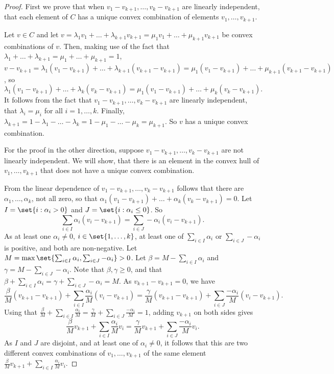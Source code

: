 \documentclass[12pt,a4paper]{article}
\begin{document}
\begin{proof}
First we prove that when $v_1-v_{k+1},\ldots,v_k-v_{k+1}$ are linearly independent, that each element of $C$ has a unique convex combination of elements $v_1,\ldots,v_{k+1}$.

Let $v\in C $ and let $v=\lambda_1v_1+\ldots+\lambda_{k+1}v_{k+1}=\mu_1v_1+\ldots+\mu_{k+1}v_{k+1}$ be convex combinations of $v$. Then, making use of the fact that $\lambda_1+\ldots+\lambda_{k+1}=\mu_1+\ldots+\mu_{k+1}=1$, $
v-v_{k+1}=\lambda_1(v_1-v_{k+1})+\ldots+\lambda_{k+1}(v_{k+1}-v_{k+1})=\mu_1(v_1-v_{k+1})+\ldots+\mu_{k+1}(v_{k+1}-v_{k+1})$,
so 
\[\lambda_1(v_1-v_{k+1})+\ldots+\lambda_{k}(v_{k}-v_{k+1})=\mu_1(v_1-v_{k+1})+\ldots+\mu_{k}(v_{k}-v_{k+1}).\]
It follows from the fact that $v_1-v_{k+1},\ldots,v_k-v_{k+1}$ are linearly independent, that $\lambda_i=\mu_i$ for all $i=1,\ldots,k$. Finally, $\lambda_{k+1}=1-\lambda_1-\ldots-\lambda_k=1-\mu_1-\ldots-\mu_k=\mu_{k+1}$. So  $v$ has a unique convex combination.

For the proof in the other direction, suppose $v_1-v_{k+1},\ldots,v_k-v_{k+1}$ are not linearly independent. We will show, that there is an element in the convex hull of $v_1,\ldots,v_{k+1}$ that does not have a unique convex combination. 



From the linear dependence of  $v_1-v_{k+1},\ldots,v_k-v_{k+1}$ follows that there are $\alpha_1,\ldots,\alpha_k$, not all zero, so that $
\alpha_1(v_1-v_{k+1})+\ldots+\alpha_k(v_k-v_{k+1})=0$. 
Let $I=\set{i:\alpha_i>0}$ and $J=\set{i:\alpha_i\le 0}$.  So 
\[
\sum_{i\in I}\alpha_i(v_i-v_{k+1})=\sum_{i\in J}-\alpha_i(v_i-v_{k+1}).
\]
As at least one $\alpha_i\neq 0$, $i\in\set{1,\ldots,k}$, at least one of $\sum_{i\in I}\alpha_i$ or $\sum_{i\in J}-\alpha_i$ is positive, and both are non-negative. Let $M=\max\set{\sum_{i\in I}\alpha_i, \sum_{i\in J}-\alpha_i}>0$. Let $\beta=M-\sum_{i\in I}\alpha_i$ and $\gamma=M-\sum_{i\in J}-\alpha_i$. Note that $\beta,\gamma\ge 0$, and that 
$\beta+\sum_{i\in I}\alpha_i=\gamma+\sum_{i\in J}-\alpha_i=M$. As $v_{k+1}-v_{k+1}=0$, we have 
\[
\frac\beta M(v_{k+1}-v_{k+1})+\sum_{i\in I}\frac{\alpha_i}M(v_i-v_{k+1})=\frac\gamma M(v_{k+1}-v_{k+1})+\sum_{i\in J}\frac{-\alpha_i}M(v_i-v_{k+1}).
\]
Using that 
$\frac\beta M+\sum_{i\in I}\frac{\alpha_i}M=\frac\gamma M+\sum_{i\in J}\frac{-\alpha_i}M=1$, adding $v_{k+1}$ on both sides gives
\[
\frac\beta Mv_{k+1}+\sum_{i\in I}\frac{\alpha_i}Mv_i=\frac\gamma Mv_{k+1}+\sum_{i\in J}\frac{-\alpha_i}Mv_i.
\]
As $I$ and $J$ are disjoint, and at least one of $\alpha_i\neq 0$, it follows that this are two different convex combinations of $v_1,\ldots,v_{k+1}$ of the same element $\frac\beta Mv_{k+1}+\sum_{i\in I}\frac{\alpha_i}Mv_i$. 
\end{proof}
\end{document}
